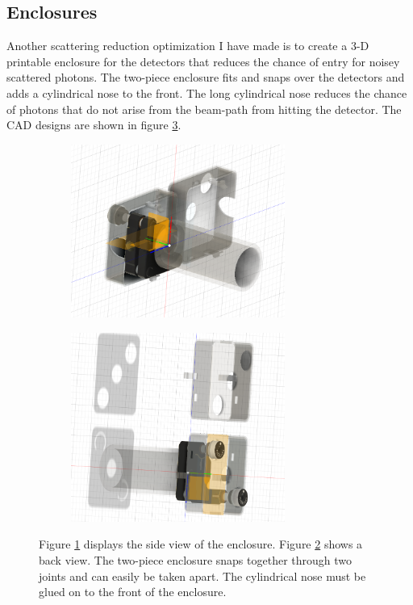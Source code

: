 \documentclass[letterpaper, 11 pt]{article}
\begin{document}
\subsection{Enclosures}

Another scattering reduction optimization I have made is to create a 3-D
printable enclosure for the detectors that reduces the chance of entry for
noisey scattered photons. The two-piece enclosure fits and snaps over the
detectors and adds a cylindrical nose to the front. The long cylindrical nose
reduces the chance of photons that do not arise from the beam-path from hitting
the detector. The CAD designs are shown in figure \ref{fig:cad_enclose}.
\begin{figure}[H]%
        \centering
        \begin{subfigure}{.4\textwidth}
        \includegraphics[width=7cm]{enclosure_1.png}
        \caption{ }
        \label{fig:side}
        \end{subfigure}
        \begin{subfigure}{.4\textwidth}
        \includegraphics[width = 7cm]{enclosure_2.png}
        \caption{ }
        \label{fig:back}
        \end{subfigure}
        \caption{Figure \ref{fig:side} displays the side view of the enclosure.
        Figure \ref{fig:back} shows a back view. The two-piece enclosure snaps
        together through two joints and can easily be taken apart. The
        cylindrical nose must be glued on to the front of the enclosure.}
        \label{fig:cad_enclose}
    \end{figure}
\end{document}

